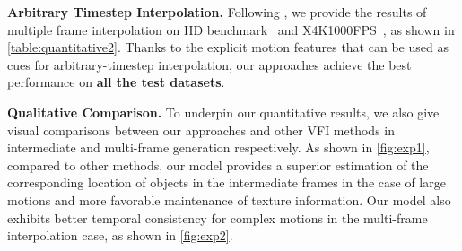 \documentclass[10pt,twocolumn,letterpaper]{article}
\begin{document}
    \noindent
    \textbf{Arbitrary Timestep Interpolation.} Following \cite{huang2020rife}, we provide the results of multiple frame interpolation on HD benchmark~\cite{bao2019memc} and X4K1000FPS~\cite{sim2021xvfi}, as shown in \cref{table:quantitative2}. Thanks to the explicit motion features that can be used as cues for arbitrary-timestep interpolation, our approaches achieve the best performance on \textbf{all the test datasets}.
     \begin{table}[t]
    \setlength{\belowcaptionskip}{0pt}
    \renewcommand\arraystretch{1.15}
    \centering
    \caption{Ablation on the inter-frame attention. We use ``SFA'' to denote the single frame attention which only applies self-attention within a single frame, ``Mixed'' to denote the attention conducted within two frames together, and ``BCV'' to denote the bilateral cost volume proposed by \cite{park2020bmbc}.}
    \vspace{-0.12in}
    \label{table:ablation1}
    \vspace{-0.25in}
    \end{table}
    
    \noindent
    \textbf{Qualitative Comparison.} To underpin our quantitative results, we also give visual comparisons between our approaches and other VFI methods in intermediate and multi-frame generation respectively. As shown in \cref{fig:exp1}, compared to other methods, our model provides a superior estimation of the corresponding location of objects in the intermediate frames in the case of large motions and more favorable maintenance of texture information. Our model also exhibits better temporal consistency for complex motions in the multi-frame interpolation case, as shown in \cref{fig:exp2}.
    
\end{document}
